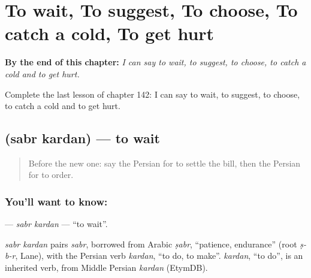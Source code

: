 
\chapter{To wait, To suggest, To choose, To catch a cold, To get hurt}
\label{ch:fa-to-wait-to-suggest-to-choose-to-catch-a-cold-to-get-hurt}

\begin{chapteropening}
\textbf{By the end of this chapter:} \emph{I can say to wait, to suggest, to choose, to catch a cold and to get hurt.}

Complete the last lesson of chapter 142: I can say to wait, to suggest, to choose, to catch a cold and to get hurt.
\end{chapteropening}

\section[\texorpdfstring{\fa{صبر} \fa{کردن} (sabr kardan)}{صبر کردن (sabr kardan)}]{  (sabr kardan) — to wait}

\label{lesson:FA-C142-sabr-kardan}



\begin{quote}
Before the new one: say the Persian for to settle the bill, then the Persian for to order.
\end{quote}

\subsection*{You'll want to know:  }
\textbf{ } — \emph{sabr kardan} — \textquotedblleft{}to wait\textquotedblright{}.

\begin{cousinweb}
\emph{sabr kardan} pairs \emph{sabr}, borrowed from Arabic \emph{ṣabr}, \textquotedblleft{}patience, endurance\textquotedblright{} (root \emph{ṣ-b-r}, Lane), with the Persian verb \emph{kardan}, \textquotedblleft{}to do, to make\textquotedblright{}. \emph{kardan}, \textquotedblleft{}to do\textquotedblright{}, is an inherited verb, from Middle Persian \emph{kardan} (EtymDB).
\end{cousinweb}

